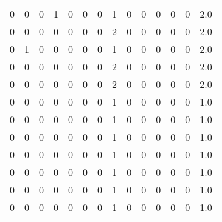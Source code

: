 \begin{tabular}{rrrrrrrrrrrrrr}
       0 &       0 &          0 &               1 &                0 &       0 &          0 &          1 &         0 &         0 &      0 &             0 &         0 &      2.0 \\
       0 &       0 &          0 &               0 &                0 &       0 &          0 &          2 &         0 &         0 &      0 &             0 &         0 &      2.0 \\
       0 &       1 &          0 &               0 &                0 &       0 &          0 &          1 &         0 &         0 &      0 &             0 &         0 &      2.0 \\
       0 &       0 &          0 &               0 &                0 &       0 &          0 &          2 &         0 &         0 &      0 &             0 &         0 &      2.0 \\
       0 &       0 &          0 &               0 &                0 &       0 &          0 &          2 &         0 &         0 &      0 &             0 &         0 &      2.0 \\
       0 &       0 &          0 &               0 &                0 &       0 &          0 &          1 &         0 &         0 &      0 &             0 &         0 &      1.0 \\
       0 &       0 &          0 &               0 &                0 &       0 &          0 &          1 &         0 &         0 &      0 &             0 &         0 &      1.0 \\
       0 &       0 &          0 &               0 &                0 &       0 &          0 &          1 &         0 &         0 &      0 &             0 &         0 &      1.0 \\
       0 &       0 &          0 &               0 &                0 &       0 &          0 &          1 &         0 &         0 &      0 &             0 &         0 &      1.0 \\
       0 &       0 &          0 &               0 &                0 &       0 &          0 &          1 &         0 &         0 &      0 &             0 &         0 &      1.0 \\
       0 &       0 &          0 &               0 &                0 &       0 &          0 &          1 &         0 &         0 &      0 &             0 &         0 &      1.0 \\
       0 &       0 &          0 &               0 &                0 &       0 &          0 &          1 &         0 &         0 &      0 &             0 &         0 &      1.0 \\

\end{tabular}
